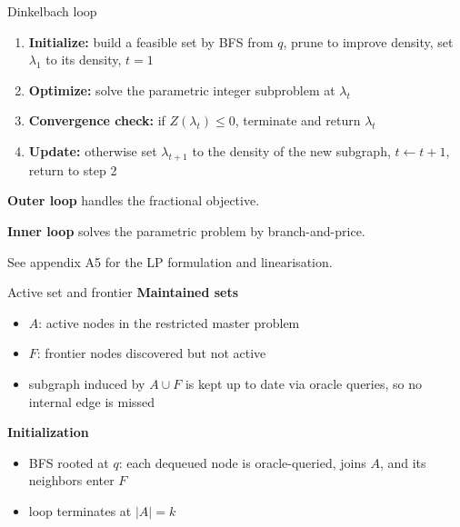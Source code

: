 \documentclass{beamer}
\begin{document}
\begin{frame}{Dinkelbach loop}
  \begin{enumerate}
    \item \textbf{Initialize:} build a feasible set by BFS from $q$, prune to improve density, set $\lambda_1$ to its density, $t = 1$
    \item \textbf{Optimize:} solve the parametric integer subproblem at $\lambda_t$
    \item \textbf{Convergence check:} if $Z(\lambda_t) \le 0$, terminate and return $\lambda_t$
    \item \textbf{Update:} otherwise set $\lambda_{t+1}$ to the density of the new subgraph, $t \gets t+1$, return to step 2
  \end{enumerate}

  \vfill

  \textbf{Outer loop} handles the fractional objective.

  \vfill

  \textbf{Inner loop} solves the parametric problem by branch-and-price.

  \vfill

  \footnotesize See appendix A5 for the LP formulation and linearisation.
\end{frame}

\begin{frame}{Active set and frontier}
  \textbf{Maintained sets}
  \begin{itemize}
    \item $A$: active nodes in the restricted master problem
    \item $F$: frontier nodes discovered but not active
    \item subgraph induced by $A \cup F$ is kept up to date via oracle queries, so no internal edge is missed
  \end{itemize}

  \vfill

  \textbf{Initialization}
  \begin{itemize}
    \item BFS rooted at $q$: each dequeued node is oracle-queried, joins $A$, and its neighbors enter $F$
    \item loop terminates at $|A| = k$
  \end{itemize}
\end{frame}
\end{document}
